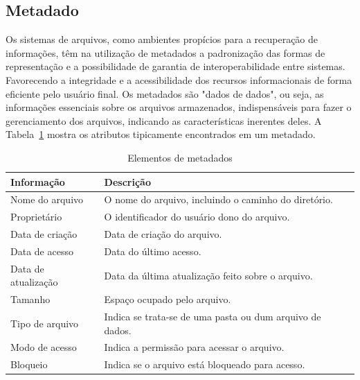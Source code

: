 	\subsection{Metadado} 
	
	Os sistemas de arquivos, como ambientes propícios para a recuperação de informações, têm na utilização de metadados a padronização das formas de representação e a possibilidade de garantia de interoperabilidade entre sistemas. Favorecendo a integridade e a acessibilidade dos recursos informacionais de forma eficiente pelo usuário final. Os metadados são "dados de dados", ou seja, as informações essenciais sobre os arquivos armazenados, indispensáveis para fazer o gerenciamento dos arquivos, indicando as características inerentes deles. A Tabela~\ref{tab:metadado} mostra os atributos tipicamente encontrados em um metadado.
	
	\capstartfalse
	\begin{table} [htb]
		\caption{Elementos de metadados}
		\centering
		\begin{tabular}{|l|l|} \hline
			\textbf{Informação} & \textbf{Descrição} \\ \hline
			
			Nome do arquivo		& O nome do arquivo, incluindo o caminho do diretório.\\ \hline
			Proprietário		& O identificador do usuário dono do arquivo.\\ \hline
			Data de criação     & Data de criação do arquivo.\\ \hline
			Data de acesso		& Data do último acesso. \\ \hline
			Data de atualização	& Data da última atualização feito sobre o arquivo. \\ \hline
			Tamanho				& Espaço ocupado pelo arquivo. \\ \hline
			Tipo de arquivo		& Indica se trata-se de uma pasta ou dum arquivo de dados.  \\ \hline
			Modo de acesso		& Indica a permissão para acessar o arquivo. \\ \hline
			Bloqueio			& Indica se o arquivo está bloqueado para acesso. \\ \hline
			
		\end{tabular}
		\label{tab:metadado}
	\end{table}
	\capstarttrue
	
